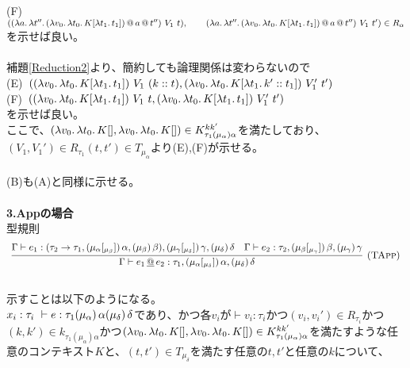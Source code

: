   (F)\ $(\LamP{a}{\Lam{t''}{\App{\App{\LamP{v_0}{\Lam{t_0}{K[\Lam{t_1}{t_1}]}}}{a}}{t''}}}\ V_1\ t),\\
  \qquad \LamP{a}{\Lam{t''}{\App{\App{\LamP{v_0}{\Lam{t_0}{K[\Lam{t_1}{t_1}]}}}{a}}{t''}}}\ V_1\ t')\in R_{\alpha}$\\
  を示せば良い。\\
  \\
  補題\ref{Reduction2}より、簡約しても論理関係は変わらないので\\
  (E)\ $(\LamP{v_0}{\Lam{t_0}{K[\Lam{t_1}{t_1}]}}\ V_1\ (\Cons{k}{t}), \LamP{v_0}{\Lam{t_0}{K[\Lam{t_1}{\Cons{k'}{t_1}}]}}\ V_1'\ t')$\\
  (F)\ $((\lambda{v_0}.\,{\lambda{t_0}.\,{K[\lambda{t_1}.\,{t_1}]}})\ V_1\ t, (\lambda{v_0}.\,{\lambda{t_0}.\,{K[\lambda{t_1}.\,{t_1}]}})\ V_1'\ t')$\\
  を示せば良い。\\
  ここで、$(\lambda{v_0}.\,{\lambda{t_0}.\,{K[]}}, \lambda{v_0}.\,{\lambda{t_0}.\,{K[]}})\in  K^{kk'}_{\tau_1(\mu_{\alpha})\alpha}$を満たしており、\\
  $(V_1, V_1')\in R_{\tau_1} (t,t')\in T_{\mu_{\alpha}}$より(E),(F)が示せる。\\
  \\
  (B)も(A)と同様に示せる。
\\
\\  
\textbf{3.Appの場合}\\
型規則  
\[
\begin{array}{c}
  \infer[\TApp]
      {\JudgeTrail{\Gamma}{\DApp{e_1}{e_2}}
                  {\tau_1}{\TrailsType{\alpha}{\delta}}{\TrailType{\delta}}}
      {\JudgeTrail{\Gamma}{e_1}
                  {\ArrowTrailP{\tau_2}{\tau_1}{\TrailsType{\alpha}{\beta}}
                                               {\TrailType{\beta}}}
                  {\TrailsType{\gamma}{\delta}}
                  {\TrailType{\delta}}
      &\JudgeTrail{\Gamma}{e_2}{\tau_2}{\TrailsType{\beta}{\gamma}}{\TrailType{\gamma}}}
\end{array}
\]
\\
示すことは以下のようになる。\\
$x_i:\tau_i\ \vdash e:\tau_1 (\mu_{\alpha})\,\alpha (\mu_{\delta})\,\delta$であり、かつ各$v_i$が$\vdash v_i:\tau_i$かつ$(v_i,v_i') \in R_{\tau_i}$かつ\\
$(k,k')\in k_{\tau_1(\mu_{\alpha})\alpha}$かつ$(\lambda{v_0}.\,{\lambda{t_0}.\,{K[]}}, \lambda{v_0}.\,{\lambda{t_0}.\,{K[]}})\in  K^{kk'}_{\tau_1(\mu_{\alpha})\alpha}$を満たすような任意のコンテキスト$K$と、$(t, t') \in T_{\mu_{\delta}}$を満たす任意の$t, t'$と任意の$k$について、\\
